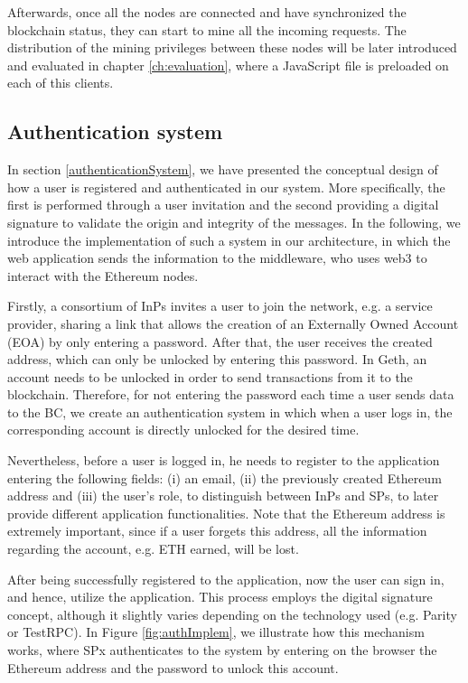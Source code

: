 Afterwards, once all the nodes are connected and have synchronized the blockchain status, they can start to mine all the incoming requests. The distribution of the mining privileges between these nodes will be later introduced and evaluated in chapter \ref{ch:evaluation}, where a JavaScript file is preloaded on each of this clients.




\subsection{Authentication system}

In section \ref{authenticationSystem}, we have presented the conceptual design of how a user is registered and authenticated in our system. More specifically, the first is performed through a user invitation and the second providing a digital signature to validate the origin and integrity of the messages. In the following, we introduce the implementation of such a system in our architecture, in which the web application sends the information to the middleware, who uses web3 to interact with the Ethereum nodes.

Firstly, a consortium of InPs invites a user to join the network, e.g. a service provider, sharing a link that allows the creation of an Externally Owned Account (EOA) by only entering a password. After that, the user receives the created address, which can only be unlocked by entering this password. In Geth, an account needs to be unlocked in order to send transactions from it to the blockchain. Therefore, for not entering the password each time a user sends data to the BC, we create an authentication system in which when a user logs in, the corresponding account is directly unlocked for the desired time.

Nevertheless, before a user is logged in, he needs to register to the application entering the following fields:  (i) an email, (ii) the previously created Ethereum address and (iii) the user's role, to distinguish between InPs and SPs, to later provide different application functionalities. Note that the Ethereum address is extremely important, since if a user forgets this address, all the information regarding the account, e.g. ETH earned, will be lost. 

After being successfully registered to the application, now the user can sign in, and hence, utilize the application. This process employs the digital signature concept, although it slightly varies depending on the technology used (e.g. Parity or TestRPC). In Figure \ref{fig:authImplem}, we illustrate how this mechanism works, where SPx authenticates to the system by entering on the browser the Ethereum address and the password to unlock this account. 


